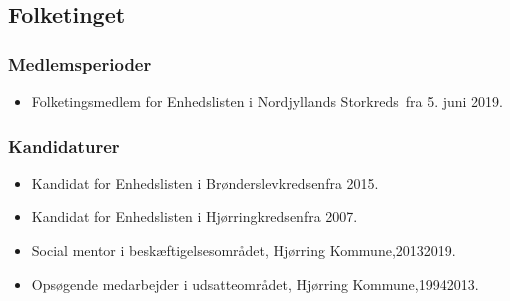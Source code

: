 \documentclass[11pt, a4paper]{awesome-cv}
\begin{document}
\begin{cvletter}
\subsection*{Folketinget}
\subsubsection*{Medlemsperioder}
\begin{itemize}
\item Folketingsmedlem for Enhedslisten i Nordjyllands Storkreds fra 5. juni 2019.
\end{itemize}
\subsubsection*{Kandidaturer}
\begin{itemize}
\item Kandidat for Enhedslisten i Brønderslevkredsenfra 2015.
\item Kandidat for Enhedslisten i Hjørringkredsenfra 2007.
\end{itemize}
\begin{itemize}
\item Social mentor i beskæftigelsesområdet, Hjørring Kommune,20132019.
\item Opsøgende medarbejder i udsatteområdet, Hjørring Kommune,19942013.
\end{itemize}
\end{cvletter}
\end{document}
